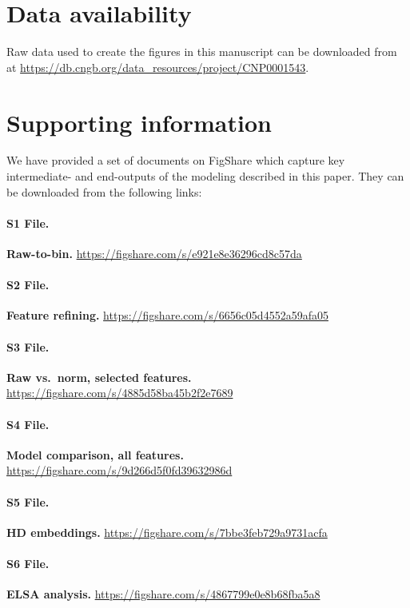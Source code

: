 \documentclass[10pt,letterpaper]{article}
\begin{document}
\section*{Data availability}

Raw data used to create the figures in this manuscript can be downloaded from \cite{Chen2022} at \url{https://db.cngb.org/data_resources/project/CNP0001543}.

\section*{Supporting information}

We have provided a set of documents on FigShare which capture key intermediate- and end-outputs of the modeling described in this paper. They can be downloaded from the following links:

\paragraph*{S1 File.}
\label{S1_File}
\textbf{Raw-to-bin.} \url{https://figshare.com/s/e921e8e36296cd8c57da}

\paragraph*{S2 File.}
\label{S2_File}
\textbf{Feature refining.} \url{https://figshare.com/s/6656c05d4552a59afa05}

\paragraph*{S3 File.}
\label{S3_File}
\textbf{Raw vs.\ norm, selected features.} \url{https://figshare.com/s/4885d58ba45b2f2e7689}

\paragraph*{S4 File.}
\label{S4_File}
\textbf{Model comparison, all features.} \url{https://figshare.com/s/9d266d5f0fd39632986d}

\paragraph*{S5 File.}
\label{S5_File}
\textbf{HD embeddings.} \url{https://figshare.com/s/7bbe3feb729a9731acfa}

\paragraph*{S6 File.}
\label{S6_File}
\textbf{ELSA analysis.} \url{https://figshare.com/s/4867799e0e8b68fba5a8}
\end{document}
